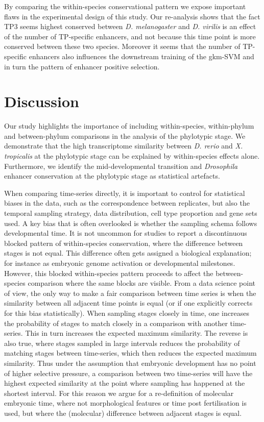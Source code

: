 By comparing the within-species conservational pattern we expose important flaws in the experimental design of this study. Our re-analysis shows that the fact TP3 seems highest conserved between \textit{D. melanogaster} and \textit{D. virilis} is an effect of the number of TP-specific enhancers, and not because this time point is more conserved between these two species. Moreover it seems that the number of TP-specific enhancers also influences the downstream training of the gkm-SVM and in turn the pattern of enhancer positive selection. 

\section{Discussion}

Our study highlights the importance of including within-species, within-phylum and between-phylum comparisons in the analysis of the phylotypic stage. We demonstrate that the high transcriptome similarity between \textit{D. rerio} and \textit{X. tropicalis} at the phylotypic stage can be explained by within-species effects alone. Furthermore, we identify the mid-developmental transition and \textit{Drosophila} enhancer conservation at the phylotypic stage as statistical artefacts. 

When comparing time-series directly, it is important to control for statistical biases in the data, such as the correspondence between replicates, but also the temporal sampling strategy, data distribution, cell type proportion and gene sets used. A key bias that is often overlooked is whether the sampling schema follows developmental time\cite{BinindaEmonds2002}. It is not uncommon for studies to report a discontinuous blocked pattern of within-species conservation, where the difference between stages is not equal. This difference often gets assigned a biological explanation; for instance as embryonic genome activation\cite{Yanai2011} or developmental milestones\cite{Levin2012}. However, this blocked within-species pattern proceeds to affect the between-species comparison where the same blocks are visible. From a data science point of view, the only way to make a fair comparison between time series is when the similarity between all adjacent time points is equal (or if one explicitly corrects for this bias statistically). When sampling stages closely in time, one increases the probability of stages to match closely in a comparison with another time-series. This in turn increases the expected maximum similarity. The reverse is also true, where stages sampled in large intervals reduces the probability of matching stages between time-series, which then reduces the expected maximum similarity. Thus under the assumption that embryonic development has no point of higher selective pressure, a comparison between two time-series will have the highest expected similarity at the point where sampling has happened at the shortest interval. For this reason we argue for a re-definition of molecular embryonic time, where not morphological features or time post fertilisation is used, but where the (molecular) difference between adjacent stages is equal.

